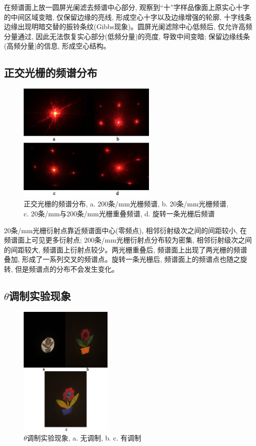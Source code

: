 \documentclass[12pt]{article}
\numberwithin{equation}{section}
\numberwithin{figure}{section}
\begin{document}
在频谱面上放一圆屏光阑滤去频谱中心部分, 观察到“十”字样品像面上原实心十字的中间区域变暗, 仅保留边缘的亮线, 形成空心十字以及边缘增强的轮廓, 十字线条边缘出现明暗交替的振铃条纹(Gibbs现象)。圆屏光阑滤除中心低频后, 仅允许高频分量通过, 因此无法恢复实心部分(低频分量)的亮度, 导致中间变暗; 保留边缘线条(高频分量)的信息, 形成空心结构。

\subsection{正交光栅的频谱分布}

\begin{figure}[ht!]
    \centering
    \includegraphics[width=0.6\textwidth]{photos/orthogonal-grating.png}
    \caption{\centering 正交光栅的频谱分布, a. 200条/mm光栅频谱, b. 20条/mm光栅频谱, c. 20条/mm与200条/mm光栅重叠频谱, d. 旋转一条光栅后频谱}
    \label{fig:experiment7}
\end{figure}

20条/mm光栅衍射点靠近频谱面中心(零频点), 相邻衍射级次之间的间距较小, 在频谱面上可见更多衍射点; 200条/mm光栅衍射点分布较为密集, 相邻衍射级次之间的间距较大, 频谱面上衍射点较少。两光栅重叠后, 频谱面上出现了两光栅的频谱叠加, 形成了一系列交叉的频谱点。旋转一条光栅后, 频谱面上的频谱点也随之旋转, 但是频谱点的分布不会发生变化。

\subsection{\texorpdfstring{$\theta$}{theta}调制实验现象}

\begin{figure}[ht!]
    \centering
    \includegraphics[width=0.4\textwidth]{photos/theta-modulation.png}
    \caption{\centering \texorpdfstring{$\theta$}{theta}调制实验现象, a. 无调制, b. c. 有调制}
    \label{fig:experiment8}
\end{figure}
\end{document}

